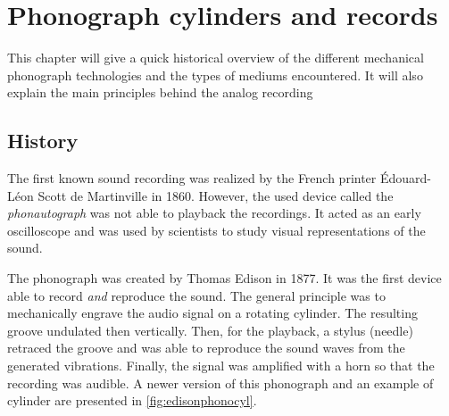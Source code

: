 

\chapter{Phonograph cylinders and records}

This chapter will give a quick historical overview of the different mechanical phonograph technologies and the types of mediums encountered. It will also explain the main principles behind the analog recording

\section{History}

The first known sound recording was realized by the French printer Édouard-Léon Scott de Martinville in 1860. However, the used device called the \emph{phonautograph} was not able to playback the recordings. It acted as an early oscilloscope and was used by scientists to study visual representations of the sound.

The phonograph was created by Thomas Edison in 1877. It was the first device able to record \emph{and} reproduce the sound. The general principle was to mechanically engrave the audio signal on a rotating cylinder. The resulting groove undulated then vertically. Then, for the playback, a stylus (needle) retraced the groove and was able to reproduce the sound waves from the generated vibrations. Finally, the signal was amplified with a horn so that the recording was audible. A newer version of this phonograph and an example of cylinder are presented in \autoref{fig:edisonphonocyl}.

